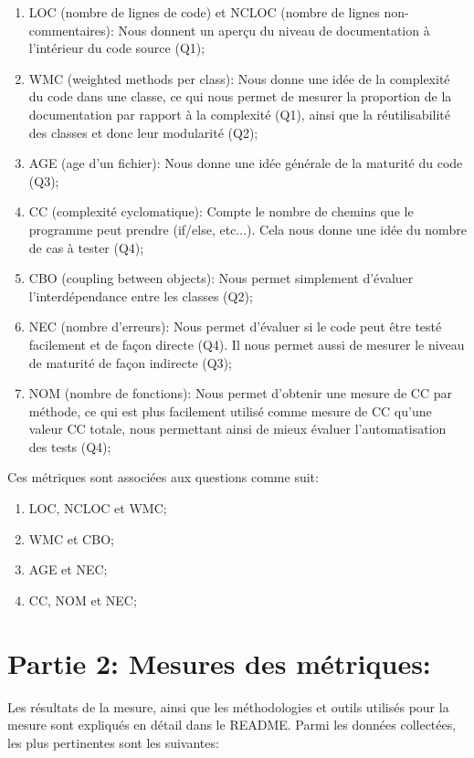 \documentclass{article}
\begin{document}
\begin{enumerate}[leftmargin=*]
\item
LOC (nombre de lignes de code) et NCLOC (nombre de lignes non-commentaires):
Nous donnent un aperçu du niveau de documentation à l'intérieur du code source (Q1);
\item
WMC (weighted methods per class):
Nous donne une idée de la complexité du code dans une classe, ce qui nous permet
de mesurer la proportion de la documentation par rapport à la complexité (Q1),
ainsi que la réutilisabilité des classes et donc leur modularité (Q2);
\item
AGE (age d'un fichier): Nous donne une idée générale de la maturité du code (Q3);
\item
CC (complexité cyclomatique): Compte le nombre de chemins que le programme peut prendre 
(if/else, etc...). Cela nous donne une idée du nombre de cas à tester (Q4);
\item
CBO (coupling between objects):
Nous permet simplement d'évaluer l'interdépendance entre les classes (Q2);
\item
NEC (nombre d'erreurs):
Nous permet d'évaluer si le code peut être testé facilement et de façon directe (Q4).
Il nous permet aussi de mesurer le niveau de maturité de façon indirecte (Q3);
\item
NOM (nombre de fonctions):
Nous permet d'obtenir une mesure de CC par méthode, ce qui est plus facilement utilisé comme mesure de CC qu'une valeur CC totale, nous permettant ainsi de mieux évaluer l'automatisation des tests (Q4);
\end{enumerate}

Ces métriques sont associées aux questions comme suit:

\begin{enumerate}[leftmargin=*, label=Q\arabic*:]
\item LOC, NCLOC et WMC;
\item WMC et CBO;
\item AGE et NEC;
\item CC, NOM et NEC;
\end{enumerate}

\section{Partie 2: Mesures des métriques:}
Les résultats de la mesure, ainsi que les méthodologies et outils utilisés
pour la mesure sont expliqués en détail dans le README.
Parmi les données collectées, les plus pertinentes sont les suivantes:
\end{document}
